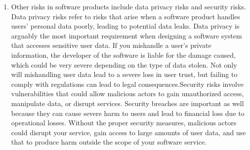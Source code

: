 \documentclass{article}
\begin{document}
\begin{enumerate}
    \item Other risks in software products include data privacy risks and security risks. Data privacy risks refer to risks that arise when a software product handles users' personal data poorly, leading to potential data leaks. Data privacy is arguably the most important requirement when designing a software system that accesses sensitive user data. If you mishandle a user's private information, the developer of the software is liable for the damage caused, which could be very severe depending on the type of data stolen. Not only will mishandling user data lead to a severe loss in user trust, but failing to comply with regulations can lead to legal consequences.\newline Security risks involve vulnerabilities that could allow malicious actors to gain unauthorized access, manipulate data, or disrupt services. Security breaches are important as well because they can cause severe harm to users and lead to financial loss due to operational losses. Without the proper security measures, malicious actors could disrupt your service, gain access to large amounts of user data, and use that to produce harm outside the scope of your software service.
\end{enumerate}
\end{document}
